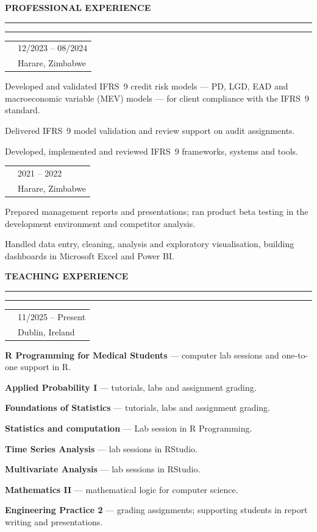 \documentclass[a4paper,10pt]{article}
\makeatletter
\newcommand{\cvsection}[1]{%
  \par\penalty-180\vspace{0.95em}%
  {\bfseries\fontsize{11.5}{12}\selectfont\color{cvblue}\MakeUppercase{#1}}%
  \par\nobreak\nointerlineskip\vspace{0.52em}%
  \noindent\textcolor{cvlime}{\rule{2.4em}{1.6pt}}%
  \textcolor{cvmist}{\rule{\dimexpr\textwidth-2.4em\relax}{1.6pt}}%
  \par\nobreak\nointerlineskip\vspace{0.42em}\nobreak%
}
\newcommand{\cventry}[4]{%
  \par\vspace{0.42em}\nointerlineskip
  \noindent\begin{tabularx}{\textwidth}{@{}>{\raggedright\arraybackslash}X@{\hspace{1em}}>{\raggedleft\arraybackslash}p{0.30\textwidth}@{}}
    {\bfseries\color{cvnavy}#1} & {\small\color{cvslate}#3}\\
    {\small\itshape\color{cvblue}#2} & {\small\color{cvslate}#4}\\
  \end{tabularx}%
  \par\nointerlineskip\vspace{0.10em}\nopagebreak%
}
\makeatother
\begin{document}
\cvsection{Professional Experience}

\cventry{Quantitative Risk Analyst}{EY Zimbabwe}{12/2023 -- 08/2024}{Harare, Zimbabwe}
\begin{cvitems}
  \item Developed and validated IFRS~9 credit risk models --- PD, LGD, EAD and macroeconomic variable (MEV) models --- for client compliance with the IFRS~9 standard.
  \item Delivered IFRS~9 model validation and review support on audit assignments.
  \item Developed, implemented and reviewed IFRS~9 frameworks, systems and tools.
\end{cvitems}

\cventry{Reporting Analyst (Intern)}{EcoCash Holdings --- Product Solutions \& Operations Management}{2021 -- 2022}{Harare, Zimbabwe}
\begin{cvitems}
  \item Prepared management reports and presentations; ran product beta testing in the development environment and competitor analysis.
  \item Handled data entry, cleaning, analysis and exploratory visualisation, building dashboards in Microsoft Excel and Power BI.
\end{cvitems}

\cvsection{Teaching Experience}

\cventry{Teaching Assistant \& Demonstrator}{Trinity College Dublin}{11/2025 -- Present}{Dublin, Ireland}
\begin{cvitems}
  \item \textbf{R Programming for Medical Students} --- computer lab sessions and one-to-one support in R.
  \item \textbf{Applied Probability I} --- tutorials, labs and assignment grading.
  \item \textbf{Foundations of Statistics} --- tutorials, labs and assignment grading.
  \item \textbf{Statistics and computation} --- Lab session in R Programming.
  \item \textbf{Time Series Analysis} --- lab sessions in RStudio.
  \item \textbf{Multivariate Analysis} --- lab sessions in RStudio.
  \item \textbf{Mathematics II} --- mathematical logic for computer science.
  \item \textbf{Engineering Practice 2} --- grading assignments; supporting students in report writing and presentations.
  
\end{cvitems}
\end{document}
